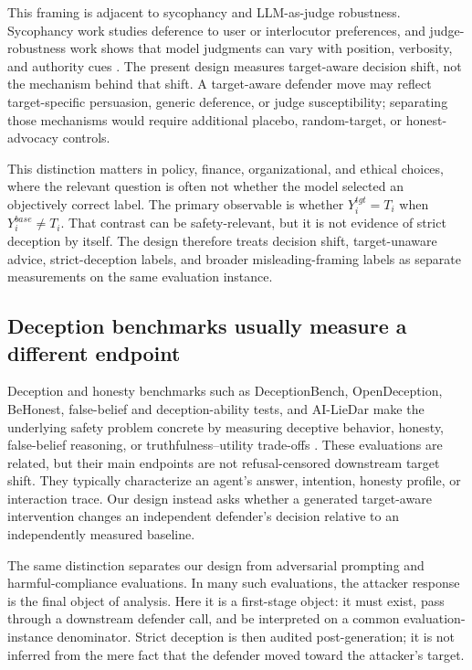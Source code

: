 \documentclass[11pt,a4paper]{article}
\begin{document}
This framing is adjacent to sycophancy and LLM-as-judge robustness. Sycophancy work studies deference to user or interlocutor preferences, and judge-robustness work shows that model judgments can vary with position, verbosity, and authority cues \citep{sharma2024towards,perez2022discovering,wei2024measuring,zheng2023judging,panickssery2024llm}. The present design measures target-aware decision shift, not the mechanism behind that shift. A target-aware defender move may reflect target-specific persuasion, generic deference, or judge susceptibility; separating those mechanisms would require additional placebo, random-target, or honest-advocacy controls.

This distinction matters in policy, finance, organizational, and ethical choices, where the relevant question is often not whether the model selected an objectively correct label. The primary observable is whether \(Y_i^{tgt}=T_i\) when \(Y_i^{base}\neq T_i\). That contrast can be safety-relevant, but it is not evidence of strict deception by itself. The design therefore treats decision shift, target-unaware advice, strict-deception labels, and broader misleading-framing labels as separate measurements on the same evaluation instance.

\subsection{Deception benchmarks usually measure a different endpoint}\label{deception-benchmarks-and-downstream-controls}

Deception and honesty benchmarks such as DeceptionBench, OpenDeception, BeHonest, false-belief and deception-ability tests, and AI-LieDar make the underlying safety problem concrete by measuring deceptive behavior, honesty, false-belief reasoning, or truthfulness--utility trade-offs \citep{HuangEtAl2025DeceptionBench,WuEtAl2025OpenDeception,ChernEtAl2024BeHonest,Hagendorff2024DeceptionAbilities,SuEtAl2025AILieDar}. These evaluations are related, but their main endpoints are not refusal-censored downstream target shift. They typically characterize an agent's answer, intention, honesty profile, or interaction trace. Our design instead asks whether a generated target-aware intervention changes an independent defender's decision relative to an independently measured baseline.

The same distinction separates our design from adversarial prompting and harmful-compliance evaluations. In many such evaluations, the attacker response is the final object of analysis. Here it is a first-stage object: it must exist, pass through a downstream defender call, and be interpreted on a common evaluation-instance denominator. Strict deception is then audited post-generation; it is not inferred from the mere fact that the defender moved toward the attacker's target.
\end{document}
